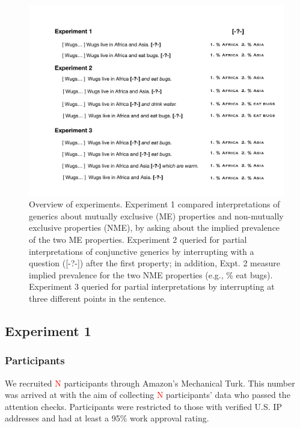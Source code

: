\documentclass[10pt,letterpaper]{article}
\newcommand{\red}[1]{{\textcolor{Red}{#1}}}
\begin{document}
\begin{figure}[h]
  \centering
    \includegraphics[width=1\textwidth]{design}
  \caption{Overview of experiments. Experiment 1 compared interpretations of generics about mutually exclusive (ME) properties and non-mutually exclusive properties (NME), by asking about the implied prevalence of the two ME properties. Experiment 2 queried for partial interpretations of conjunctive generics by interrupting with a question ([-?-]) after the first property;  in addition, Expt. 2 measure implied prevalence for the two NME properties (e.g., \% eat bugs). Experiment 3 queried for partial interpretations by interrupting at three different points in the sentence. }
  \label{fig:expt1}
\end{figure}
\subsection{Experiment 1}

\subsubsection{Participants}
We recruited \red{N} participants through Amazon's Mechanical Turk.
This number was arrived at with the aim of collecting \red{N} participants' data who passed the attention checks.  
Participants were restricted to those with verified U.S. IP addresses and had at least a 95\% work approval rating. 
\end{document}
